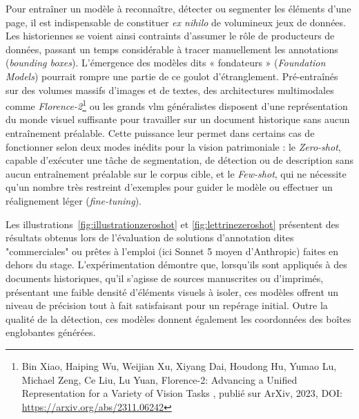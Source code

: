 Pour entraîner un modèle à reconnaître, détecter ou segmenter les éléments d'une page, il est indispensable de constituer \textit{ex nihilo} de volumineux jeux de données. Les historien\pmm nes se voient ainsi contraints d'assumer le rôle de producteurs de données, passant un temps considérable à tracer manuellement les annotations (\textit{bounding boxes}). L'émergence des modèles dits « fondateurs » (\textit{Foundation Models}) pourrait rompre une partie de ce goulot d'étranglement. Pré-entraînés sur des volumes massifs d'images et de textes, des architectures multimodales comme \textit{Florence-2}\footnote{Bin Xiao, Haiping Wu, Weijian Xu, Xiyang Dai, Houdong Hu, Yumao Lu, Michael Zeng, Ce Liu, Lu Yuan, \og Florence-2: Advancing a Unified Representation for a Variety of Vision Tasks \fg, publié sur ArXiv, 2023, DOI: \href{https://arxiv.org/abs/2311.06242}{https://arxiv.org/abs/2311.06242}} ou les grands \gls{vlm} généralistes disposent d'une représentation du monde visuel suffisante pour travailler sur un document historique sans aucun entraînement préalable. Cette puissance leur permet dans certains cas de fonctionner selon deux modes inédits pour la vision patrimoniale : le \textit{Zero-shot}, capable d'exécuter une tâche de segmentation, de détection ou de description sans aucun entraînement préalable sur le corpus cible, et le \textit{Few-shot}, qui ne nécessite qu'un nombre très restreint d'exemples pour guider le modèle ou effectuer un réalignement léger (\textit{fine-tuning}).

Les illustrations~\ref{fig:illustrationzeroshot} et \ref{fig:lettrinezeroshot} présentent des résultats obtenus lors de l'évaluation de solutions d'annotation dites "commerciales" ou prêtes à l'emploi (ici Sonnet 5 moyen d'Anthropic) faites en dehors du stage. L'expérimentation démontre que, lorsqu'ils sont appliqués à des documents historiques, qu'il s'agisse de sources manuscrites ou d'imprimés, présentant une faible densité d'éléments visuels à isoler, ces modèles offrent un niveau de précision tout à fait satisfaisant pour un repérage initial. Outre la qualité de la détection, ces modèles donnent également les coordonnées des boîtes englobantes générées. 

